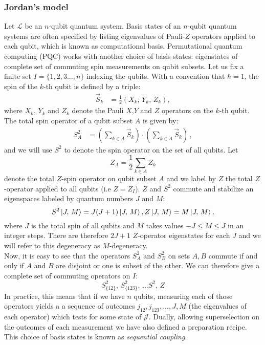 \documentclass{article}
\begin{document}
\subsubsection{Jordan's model}
Let $\mathcal{L}$ be an $n$-qubit quantum system. Basis states of an $n$-qubit quantum systems are often specified by listing eigenvalues of Pauli-$Z$ operators applied to each qubit, which is known as computational basis.
Permutational quantum computing (PQC) works with another choice of basis states: eigenstates of complete set of commuting spin measurements on qubit subsets. Let us fix a finite set $I=\{1,2,3...,n\}$ indexing the qubits. With a convention that $\hbar = 1$, the spin of the $k$-th qubit is defined by a triple:
\begin{align*}
\vec{S}_k &= \frac{1}{2} \left( X_k, \, Y_k, \,Z_k \right),
\end{align*}
where $X_k$, $Y_k$ and $Z_k$ denote the Pauli $X$,$Y$ and $Z$ operators on the $k$-th qubit. The total spin operator of a qubit subset $A$  is given by:
\begin{align*}
S_A^2 &= \left( \sum_{k \in A} \vec{S}_k \right) \cdot  \left( \sum_{k \in A} \vec{S}_k \right)\,,
\end{align*} 
and we will use $S^2$ to denote the spin operator on the set of all qubits. 
Let 
$$Z_A = \frac{1}{2} \sum_{k \in A} Z_k $$ 
denote the total $Z$-spin operator on qubit subset $A$ and we label by $Z$ the total $Z$-operator applied to all qubits (i.e $Z=Z_I$). $Z$ and $S^2$ commute and stabilize an eigenspaces labeled by quantum numbers $J$ and $M$: 
\begin{equation}
S^2  \ket{J, \, M} = J (J +1 ) \ket{J, \, M},  \\
Z \ket{J, \, M} = M \ket{J, \, M},
\end{equation} 
where $J$ is the total spin of all qubits and $M$ takes values $ -J \leq M \leq J$ in an integer steps. There are therefore $2J + 1$ $Z$-operator eigenstates for each $J$ and we will refer to this degeneracy as $M$-degeneracy. \\
Now, it is easy to see that the operators $S_A^2$ and $S_B^2$ on sets $A, B$ commute if and only if $A$ and $B$ are disjoint or one is subset of the other. We can therefore give a complete set of commuting operators on $I$:
\begin{equation} \label{comS}
S_{\lbrace12\rbrace}^2, \, S_{\lbrace123\rbrace}^2, \, \ldots S^2, \, Z
\end{equation}
In practice, this means that if we have $n$ qubits, measuring each of those operators yields a a sequence of outcomes $j_{12}, j_{123}, ... , J, M$ (the eigenvalues of each operator) which tests for some state of $\mathcal{J}$. Dually, allowing superselection on the outcomes of each measurement we have also defined a preparation recipe. This choice of basis states is known as \textit{sequential coupling}.\\
\end{document}
